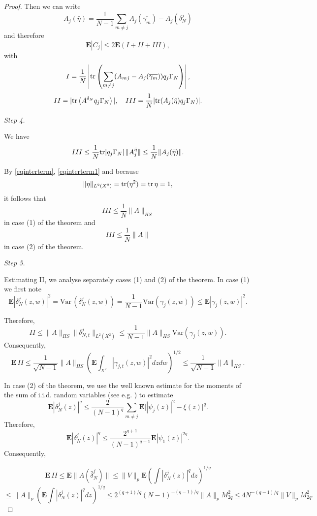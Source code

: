 \documentclass[12pt]{article}
\def\E{\mathbf{E}}
\def\tr{\rm{tr}}
\def\de{\delta}
\def\ga{\gamma}
\newcommand{\Ga}{\Gamma}
\begin{document}
\begin{proof}
Then we can write
 \[
 A_j(\bar \eta)=\frac{1}{N-1}\sum_{m\neq j}A_j(\overline{\ga_m})-A_j(\de^j_N)
 \]
 and therefore
 \begin{equation}
\label{eqforalphaconder3}
\E |C_j| \le 2\E (I+II+III),
\end{equation}
with
\[
I= \frac{1}{N}  \left|{\tr} \left(\sum_{m\neq j} (A_{mj}-A_j(\overline{\ga_m}))q_j \Ga_N\right)\right|,
\]
\[
II=|{\tr} \left(A^{\de_N} q_j \Ga_N\right)|, \quad
III=\frac{1}{N} |{\tr} ( A_j(\bar \eta) q_j \Ga_N)|.
\]

{\it Step 4.}

We have
\[
III \le \frac{1}{N} {\tr} |q_j\Ga_N| \, \| A_j^{\bar \eta}\|
\le \frac{1}{N} \| A_j(\bar \eta)\|.
\]

By \eqref{eqinterterm}, \eqref{eqinterterm1} and because
\[
\|\eta\|_{L^2(X^2)}= {\tr} (\eta^2) ={\tr }\, \eta = 1,
\]
it follows that
\[
III \le \frac{1}{N} \|A\|_{HS}
\]
in case (1) of the theorem and
\[
III \le \frac{1}{N} \|A\|
\]
in case (2) of the theorem.

{\it Step 5.}

Estimating II, we analyse separately cases (1) and (2) of the theorem.
In case (1) we first note
  \begin{equation}
\label{estimatedelta}
\E |\de^j_N(z,w)|^2=\text{Var} \, (\de^j_N(z,w))
 = \frac{1}{N-1} \text{Var} (\ga_j(z,w))
 \le  \E |\ga_j(z,w)|^2.
\end{equation}

Therefore,
\[
II \le \|A\|_{HS} \|\de^j_{N,t}\|_{L^2(X^2)} \le \frac{1}{N-1} \|A\|_{HS} \text{Var} (\ga_j(z,w)).
\]
Consequently,
\[
\E \, II \le \frac{1}{\sqrt{N-1}}\|A\|_{HS} \left(\E \int_{X^2} |\ga_{j,t}(z,w)|^2 dzdw  \right)^{1/2}
\le \frac{1}{\sqrt{N-1}}\|A\|_{HS}.
 \]

In case (2) of the theorem, we use the well known estimate for the moments of the sum of i.i.d. random
variables  (see e.g. \cite{Bahr}) to estimate
\[
\E |\de^j_N(z)|^q \le \frac{2}{(N-1)^q} \sum_{m\neq j} \E \bigl||\psi_j(z)|^2-\xi(z) \bigr|^q.
\]
Therefore,
\[
\E |\de^j_N(z)|^q \le \frac{2^{q+1}}{(N-1)^{q-1}}\E |\psi_1(z)|^{2q}.
\]
Consequently,

\[
\E \, II  \le \E \|A(\bar \de^j_N)\|\le \|V\|_p \E \left(\int |\de^j_N(z)|^q dz\right)^{1/q}
\]
\begin{equation}
\label{eqforalphaconder4}
\le  \|A\|_p \left(\E \int |\de^j_N(z)|^q dz\right)^{1/q}
 \le 2^{(q+1)/q} (N-1)^{-(q-1)/q} \|A\|_p M_{2q}^2
  \le 4 N^{-(q-1)/q} \|V\|_p M_{2q}^2.
\end{equation}


\end{proof}
\end{document}
